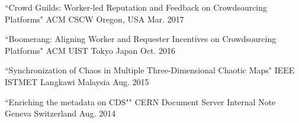 

\begin{cventries}

  \cventry
    {``Crowd Guilds: Worker-led Reputation and Feedback on Crowdsourcing Platforms"} %
    {ACM CSCW} %
    {Oregon, USA} %
    {Mar. 2017} %
    {
      \begin{cvitems} %
      \end{cvitems}
    }



  \cventry
    {``Boomerang: Aligning Worker and Requester Incentives on Crowdsourcing Platforms"} %
    {ACM UIST} %
    {Tokyo Japan} %
    {Oct. 2016} %
    {
      \begin{cvitems} %
      \end{cvitems}
    }


  \cventry
    {``Synchronization of Chaos in Multiple Three-Dimensional Chaotic Maps"} %
    {IEEE ISTMET} %
    {Langkawi Malaysia} %
    {Aug. 2015} %
    {
      \begin{cvitems} %
      \end{cvitems}
    }


  \cventry
    {``Enriching the metadata on CDS""} %
    {CERN Document Server Internal Note} %
    {Geneva Switzerland} %
    {Aug. 2014} %
    {
      \begin{cvitems} %
      \end{cvitems}
    }


\end{cventries}
